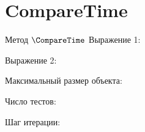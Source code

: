 \section{CompareTime}
\begin{frame}{Метод $\CompareTime$}
	Выражение 1:


	Выражение 2:


	Максимальный размер объекта:

	Число тестов:

	Шаг итерации:



\end{frame}

